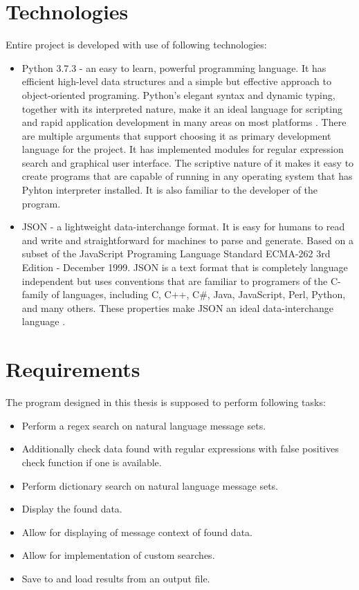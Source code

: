 \documentclass[a4paper,twoside,12pt]{book}
\begin{document}
\section{Technologies}
Entire project is developed with use of following technologies:
\begin{itemize}
   \item Python 3.7.3 - an easy to learn, powerful programming language. It has efficient high-level data structures 
   and a simple but effective approach to object-oriented programing. Python’s elegant syntax and dynamic typing, together with its interpreted nature, make it 
   an ideal language for scripting and rapid application development in many areas on most platforms \cite{bib:bookPython}. There are multiple arguments that support
   choosing it as primary development language for the project. It has implemented modules for regular expression search and graphical user interface.
   The scriptive nature of it makes it easy to create programs that are capable of running in any operating system that has Pyhton interpreter installed.
   It is also familiar to the developer of the program.
   \item JSON - a lightweight data-interchange format. It is easy for humans to read and write and straightforward for machines to parse and generate. Based on a
   subset of the JavaScript Programing Language Standard ECMA-262 3rd Edition - December 1999. JSON is a text format that is completely language independent but
   uses conventions that are familiar to programers of the C-family of languages, including C, C++, C\#, Java, JavaScript, Perl, Python, and many others. These
   properties make JSON an ideal data-interchange language \cite{bib:internetJSON}.
\end{itemize}

\section{Requirements}

The program designed in this thesis is supposed to perform following tasks:
\begin{itemize}
   \item Perform a regex search on natural language message sets.
   \item Additionally check data found with regular expressions with false positives check function if one is available.
   \item Perform dictionary search on natural language message sets.
   \item Display the found data.
   \item Allow for displaying of message context of found data.
   \item Allow for implementation of custom searches.
   \item Save to and load results from an output file.
\end{itemize}
\end{document}
